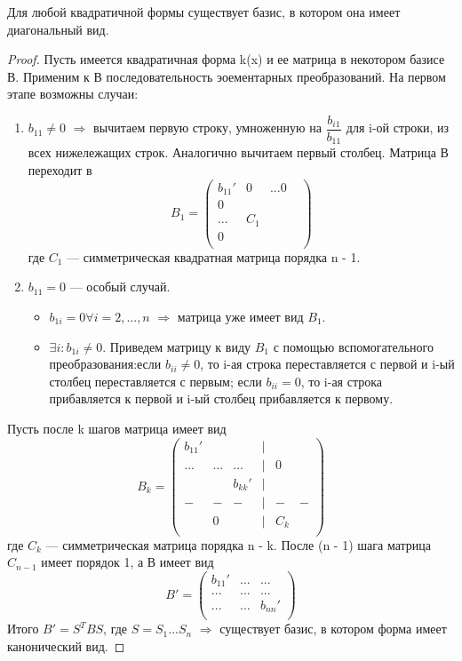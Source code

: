 \begin{theorem}
    Для любой квадратичной формы существует базис, в котором она имеет диагональный вид.
\end{theorem}
\begin{proof}
Пусть имеется квадратичная форма k(x) и ее матрица в некотором базисе В. Применим к В последовательность эоементарных преобразований. На первом этапе возможны случаи:
\begin{enumerate}
    \item $b_{11} \neq 0$ $\Longrightarrow$ вычитаем первую строку, умноженную на $\dfrac{b_{i1}}{b_{11}}$ для i-ой строки, из всех нижележащих строк. Аналогично вычитаем первый столбец. Матрица В переходит в 
    \[
    B_1 = \begin{pmatrix}
        b_{11}' & 0 & ...0\\
        0 & & & \\
        ... & C_1 & & \\
        0 & & & \\
    \end{pmatrix}
    \]
    где $C_1$ --- симметрическая квадратная матрица порядка n - 1.
    \item $b_{11} = 0$ --- особый случай.
    \begin{itemize}
        \item $b_{1i} = 0 \forall i = 2, ..., n$ $\Longrightarrow$ матрица уже имеет вид $B_1$.
        \item $\exists i : b_{1i} \neq 0$. Приведем матрицу к виду $B_1$ с помощью вспомогательного преобразования:если $b_{ii} \neq 0$, то i-ая строка переставляется с первой и i-ый столбец переставляется с первым; если $b_{ii} = 0$, то i-ая строка прибавляется к первой и i-ый столбец прибавляется к первому.
    \end{itemize}
\end{enumerate}
Пусть после k шагов матрица имеет вид
\[
B_k = \begin{pmatrix}
    b_{11}' & &  & | & &\\
    ... & ... & ... & | & 0 & \\
     & & b_{kk}' & | & & \\
    - & - & - & | & - & - \\
     & 0 & & | & C_k & \\
\end{pmatrix}
\]
где $C_k$ --- симметрическая матрица порядка n - k.
После (n - 1) шага матрица $C_{n - 1}$ имеет порядок 1, а В имеет вид
\[
B' = \begin{pmatrix}
    b_{11}' & ... & ...\\
    ... & ... & ... \\
    ... & ... & b_{nn}'\\
\end{pmatrix}
\]
Итого $B' = S^TBS$, где $S = S_1...S_n$ $\Longrightarrow$ существует базис, в котором форма имеет канонический вид.
\end{proof}

